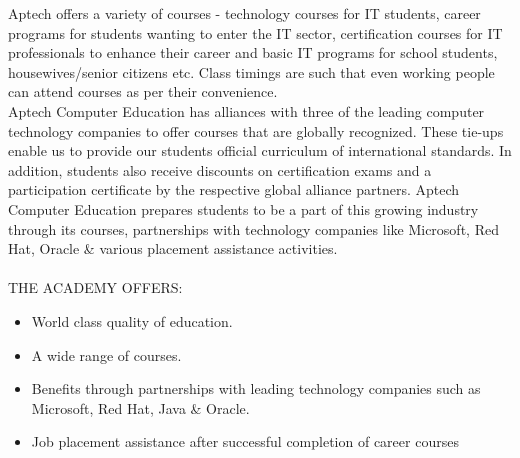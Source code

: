 \noindent Aptech offers a variety of courses - technology
courses for IT students, career programs for students
wanting to enter the IT sector, certification courses
for IT professionals to enhance their career and basic
IT programs for school students, housewives/senior
citizens etc. Class timings are such that even working people can attend courses as per their convenience.\\

\noindent Aptech Computer Education has alliances with three of the leading computer technology companies to offer courses that are globally recognized. These tie-ups enable us to provide our students official curriculum of international standards. In addition, students also receive discounts on certification exams and a participation certificate by the respective global alliance partners. Aptech Computer Education prepares students to be a part of this growing industry through its
courses, partnerships with technology companies like Microsoft, Red Hat, Oracle \& various placement assistance activities.\\\\


THE ACADEMY OFFERS:\\
\begin{itemize}
\item World class quality of education.
\item A wide range of courses.
\item Benefits through partnerships with leading technology companies such as Microsoft, Red Hat, Java \& Oracle.
\item Job placement assistance after successful completion of career courses
\end{itemize}


